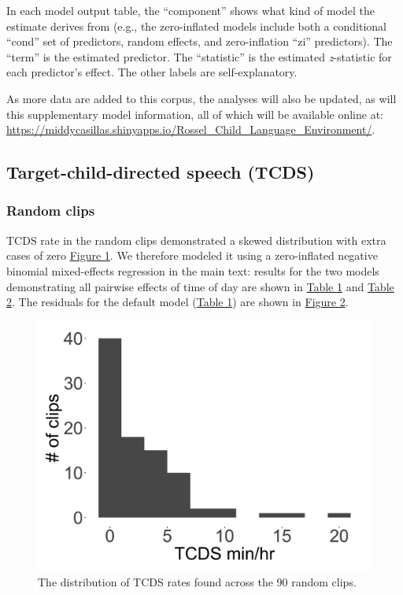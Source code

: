 \documentclass[,man,floatsintext]{apa6}
\begin{document}
In each model output table, the \enquote{component} shows what kind of
model the estimate derives from (e.g., the zero-inflated models include
both a conditional \enquote{cond} set of predictors, random effects, and
zero-inflation \enquote{zi} predictors). The \enquote{term} is the
estimated predictor. The \enquote{statistic} is the estimated
\emph{z}-statistic for each predictor's effect. The other labels are
self-explanatory.

As more data are added to this corpus, the analyses will also be
updated, as will this supplementary model information, all of which will
be available online at:
\url{https://middycasillas.shinyapps.io/Rossel_Child_Language_Environment/}.

\subsection{Target-child-directed speech (TCDS)}\label{models-tcds}

\subsubsection{Random clips}\label{models-tcds-random}

TCDS rate in the random clips demonstrated a skewed distribution with
extra cases of zero \protect\hyperlink{fig1}{Figure 1}. We therefore
modeled it using a zero-inflated negative binomial mixed-effects
regression in the main text: results for the two models demonstrating
all pairwise effects of time of day are shown in
\protect\hyperlink{tab1}{Table 1} and \protect\hyperlink{tab2}{Table 2}.
The residuals for the default model (\protect\hyperlink{tab1}{Table 1})
are shown in \protect\hyperlink{fig2}{Figure 2}.

\FloatBarrier

\begin{figure}[H]

{\centering \includegraphics[width=0.4\linewidth]{www/TCDS_random_distribution} 

}

\caption{The distribution of TCDS rates found across the 90 random clips.}\label{fig:fig1}
\end{figure}
\end{document}
